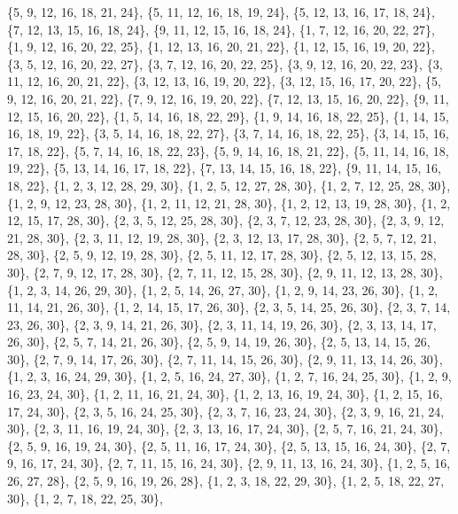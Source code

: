 \documentclass[11pt,a4paper]{article}
\begin{document}
{\{5, 9, 12, 16, 18, 21, 24\}, \{5, 11, 12, 16, 18, 19, 24\}, \{5, 12, 13, 16, 17, 18, 24\}, \{7, 12, 13, 15, 16, 18, 24\}, \{9, 11, 12, 15, 16, 18, 24\},
\{1, 7, 12, 16, 20, 22, 27\}, \{1, 9, 12, 16, 20, 22, 25\}, \{1, 12, 13, 16, 20, 21, 22\}, \{1, 12, 15, 16, 19, 20, 22\}, \{3, 5, 12, 16, 20, 22, 27\},
\{3, 7, 12, 16, 20, 22, 25\}, \{3, 9, 12, 16, 20, 22, 23\}, \{3, 11, 12, 16, 20, 21, 22\}, \{3, 12, 13, 16, 19, 20, 22\}, \{3, 12, 15, 16, 17, 20, 22\},
\{5, 9, 12, 16, 20, 21, 22\}, \{7, 9, 12, 16, 19, 20, 22\}, \{7, 12, 13, 15, 16, 20, 22\}, \{9, 11, 12, 15, 16, 20, 22\}, \{1, 5, 14, 16, 18, 22, 29\},
\{1, 9, 14, 16, 18, 22, 25\}, \{1, 14, 15, 16, 18, 19, 22\}, \{3, 5, 14, 16, 18, 22, 27\}, \{3, 7, 14, 16, 18, 22, 25\}, \{3, 14, 15, 16, 17, 18, 22\},
\{5, 7, 14, 16, 18, 22, 23\}, \{5, 9, 14, 16, 18, 21, 22\}, \{5, 11, 14, 16, 18, 19, 22\}, \{5, 13, 14, 16, 17, 18, 22\}, \{7, 13, 14, 15, 16, 18, 22\},
\{9, 11, 14, 15, 16, 18, 22\}, \{1, 2, 3, 12, 28, 29, 30\}, \{1, 2, 5, 12, 27, 28, 30\}, \{1, 2, 7, 12, 25, 28, 30\}, \{1, 2, 9, 12, 23, 28, 30\},
\{1, 2, 11, 12, 21, 28, 30\}, \{1, 2, 12, 13, 19, 28, 30\}, \{1, 2, 12, 15, 17, 28, 30\}, \{2, 3, 5, 12, 25, 28, 30\}, \{2, 3, 7, 12, 23, 28, 30\},
\{2, 3, 9, 12, 21, 28, 30\}, \{2, 3, 11, 12, 19, 28, 30\}, \{2, 3, 12, 13, 17, 28, 30\}, \{2, 5, 7, 12, 21, 28, 30\}, \{2, 5, 9, 12, 19, 28, 30\},
\{2, 5, 11, 12, 17, 28, 30\}, \{2, 5, 12, 13, 15, 28, 30\}, \{2, 7, 9, 12, 17, 28, 30\}, \{2, 7, 11, 12, 15, 28, 30\}, \{2, 9, 11, 12, 13, 28, 30\},
\{1, 2, 3, 14, 26, 29, 30\}, \{1, 2, 5, 14, 26, 27, 30\}, \{1, 2, 9, 14, 23, 26, 30\}, \{1, 2, 11, 14, 21, 26, 30\}, \{1, 2, 14, 15, 17, 26, 30\},
\{2, 3, 5, 14, 25, 26, 30\}, \{2, 3, 7, 14, 23, 26, 30\}, \{2, 3, 9, 14, 21, 26, 30\}, \{2, 3, 11, 14, 19, 26, 30\}, \{2, 3, 13, 14, 17, 26, 30\},
\{2, 5, 7, 14, 21, 26, 30\}, \{2, 5, 9, 14, 19, 26, 30\}, \{2, 5, 13, 14, 15, 26, 30\}, \{2, 7, 9, 14, 17, 26, 30\}, \{2, 7, 11, 14, 15, 26, 30\},
\{2, 9, 11, 13, 14, 26, 30\}, \{1, 2, 3, 16, 24, 29, 30\}, \{1, 2, 5, 16, 24, 27, 30\}, \{1, 2, 7, 16, 24, 25, 30\}, \{1, 2, 9, 16, 23, 24, 30\},
\{1, 2, 11, 16, 21, 24, 30\}, \{1, 2, 13, 16, 19, 24, 30\}, \{1, 2, 15, 16, 17, 24, 30\}, \{2, 3, 5, 16, 24, 25, 30\}, \{2, 3, 7, 16, 23, 24, 30\},
\{2, 3, 9, 16, 21, 24, 30\}, \{2, 3, 11, 16, 19, 24, 30\}, \{2, 3, 13, 16, 17, 24, 30\}, \{2, 5, 7, 16, 21, 24, 30\}, \{2, 5, 9, 16, 19, 24, 30\},
\{2, 5, 11, 16, 17, 24, 30\}, \{2, 5, 13, 15, 16, 24, 30\}, \{2, 7, 9, 16, 17, 24, 30\}, \{2, 7, 11, 15, 16, 24, 30\}, \{2, 9, 11, 13, 16, 24, 30\},
\{1, 2, 5, 16, 26, 27, 28\}, \{2, 5, 9, 16, 19, 26, 28\}, \{1, 2, 3, 18, 22, 29, 30\}, \{1, 2, 5, 18, 22, 27, 30\}, \{1, 2, 7, 18, 22, 25, 30\},
}
\end{document}
